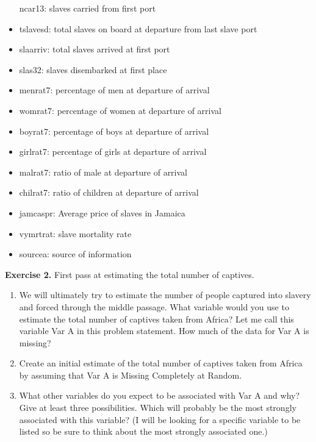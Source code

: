 \documentclass[11pt]{article}
\providecommand{\tightlist}{%
      \setlength{\itemsep}{0pt}\setlength{\parskip}{0pt}}
\begin{document}
\begin{itemize}
  ncar13: slaves carried from first port
\item
  tslavesd: total slaves on board at departure from last slave port
\item
  slaarriv: total slaves arrived at first port
\item
  slas32: slaves disembarked at first place
\item
  menrat7: percentage of men at departure of arrival
\item
  womrat7: percentage of women at departure of arrival
\item
  boyrat7: percentage of boys at departure of arrival
\item
  girlrat7: percentage of girls at departure of arrival
\item
  malrat7: ratio of male at departure of arrival
\item
  chilrat7: ratio of children at departure of arrival
\item
  jamcaspr: Average price of slaves in Jamaica
\item
  vymrtrat: slave mortality rate
\item
  sourcea: source of information
\end{itemize}

    \textbf{Exercise 2.} First pass at estimating the total number of
captives.

\begin{enumerate}
\def\labelenumi{\arabic{enumi}.}
\tightlist
\item
  We will ultimately try to estimate the number of people captured into
  slavery and forced through the middle passage. What variable would you
  use to estimate the total number of captives taken from Africa? Let me
  call this variable Var A in this problem statement. How much of the
  data for Var A is missing?
\item
  Create an initial estimate of the total number of captives taken from
  Africa by assuming that Var A is Missing Completely at Random.\\
\item
  What other variables do you expect to be associated with Var A and
  why? Give at least three possibilities. Which will probably be the
  most strongly associated with this variable? (I will be looking for a
  specific variable to be listed so be sure to think about the most
  strongly associated one.)
\end{enumerate}
\end{document}
